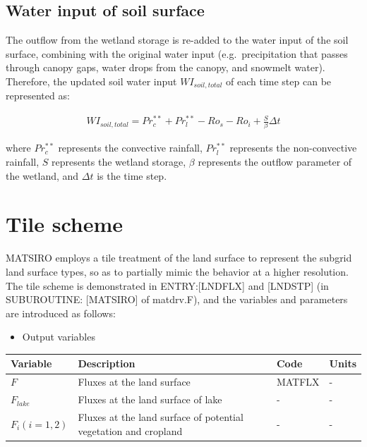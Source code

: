 \subsection{Water input of soil surface}\label{water-input-of-soil-surface}

The outflow from the wetland storage is re-added to the water input of the soil surface, combining with the original water input (e.g.~precipitation that passes through canopy gaps, water drops from
the canopy, and snowmelt water). Therefore, the updated soil water input \(WI_{soil,total}\) of each time step can be represented as:

\begin{eqnarray}
WI_{soil,total}=Pr_{c}^{**}+Pr_{l}^{**}-Ro_{s}-Ro_{i}+\frac{S}{\beta }\Delta t
\end{eqnarray}

where \(Pr_{c}^{**}\) represents the convective rainfall, \(Pr_{l}^{**}\) represents the non-convective rainfall, \(S\) represents the wetland storage, \(\beta\) represents the outflow parameter of
the wetland, and \(\Delta t\) is the time step.

\section{Tile scheme}\label{tile-scheme}

MATSIRO employs a tile treatment of the land surface to represent the subgrid land surface types, so as to partially mimic the behavior at a higher resolution. The tile scheme is demonstrated in
ENTRY:{[}LNDFLX{]} and {[}LNDSTP{]} (in SUBUROUTINE: {[}MATSIRO{]} of matdrv.F), and the variables and parameters are introduced as follows:

\begin{itemize}
\tightlist
\item
  Output variables
\end{itemize}

\begin{longtable}[]{@{}llll@{}}
\toprule\noalign{}
Variable & Description & Code & Units \\
\midrule\noalign{}
\endhead
\bottomrule\noalign{}
\endlastfoot
\(F\) & Fluxes at the land surface & MATFLX & - \\
\(F_{lake}\) & Fluxes at the land surface of lake & - & - \\
\(F_i(i=1,2)\) & Fluxes at the land surface of potential vegetation and cropland & - & - \\
\end{longtable}


